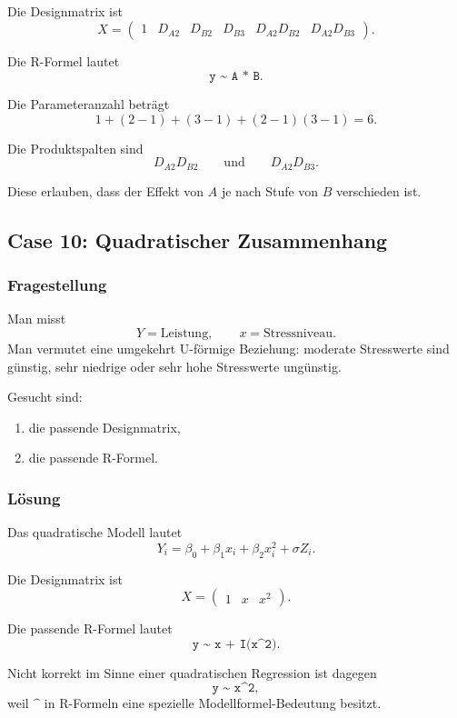 \documentclass[10pt, letterpaper]{article}
\begin{document}
Die Designmatrix ist
\[
X=
\begin{pmatrix}
1 & D_{A2} & D_{B2} & D_{B3}
& D_{A2}D_{B2} & D_{A2}D_{B3}
\end{pmatrix}.
\]

Die R-Formel lautet
\[
\texttt{y \textasciitilde{} A * B}.
\]

Die Parameteranzahl beträgt
\[
1+(2-1)+(3-1)+(2-1)(3-1)=6.
\]

Die Produktspalten sind
\[
D_{A2}D_{B2}
\qquad\text{und}\qquad
D_{A2}D_{B3}.
\]

Diese erlauben, dass der Effekt von \(A\) je nach Stufe von \(B\) verschieden ist.

\subsection{Case 10: Quadratischer Zusammenhang}

\subsubsection*{Fragestellung}

Man misst
\[
Y=\text{Leistung},
\qquad
x=\text{Stressniveau}.
\]
Man vermutet eine umgekehrt U-förmige Beziehung: moderate Stresswerte sind günstig, sehr niedrige oder sehr hohe Stresswerte ungünstig.

Gesucht sind:
\begin{enumerate}
    \item die passende Designmatrix,
    \item die passende R-Formel.
\end{enumerate}

\subsubsection*{Lösung}

Das quadratische Modell lautet
\[
Y_i=\beta_0+\beta_1x_i+\beta_2x_i^2+\sigma Z_i.
\]

Die Designmatrix ist
\[
X=
\begin{pmatrix}
1 & x & x^2
\end{pmatrix}.
\]

Die passende R-Formel lautet
\[
\texttt{y \textasciitilde{} x + I(x\textasciicircum{}2)}.
\]

Nicht korrekt im Sinne einer quadratischen Regression ist dagegen
\[
\texttt{y \textasciitilde{} x\textasciicircum{}2},
\]
weil \(\texttt{\textasciicircum{}}\) in R-Formeln eine spezielle Modellformel-Bedeutung besitzt.
\end{document}
